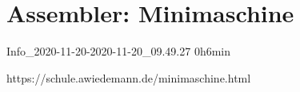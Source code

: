 \documentclass{lehramt-informatik-haupt}
\begin{document}

\chapter{Assembler: Minimaschine}

Info\_2020-11-20-2020-11-20\_09.49.27 0h6min

https://schule.awiedemann.de/minimaschine.html

\literatur
\end{document}
